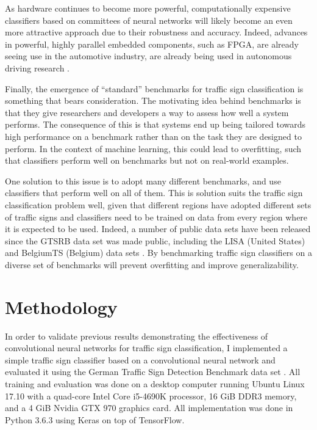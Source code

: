 \documentclass[letterpaper,twocolumn,10pt]{article}
\begin{document}
As hardware continues to become more powerful, computationally expensive classifiers based on committees of neural networks will likely become an even more attractive approach due to their robustness and accuracy. Indeed, advances in powerful, highly parallel embedded components, such as FPGA, are already seeing use in the automotive industry, are already being used in autonomous driving research \cite{fpga, fpga2}.

Finally, the emergence of ``standard'' benchmarks for traffic sign classification is something that bears consideration. The motivating idea behind benchmarks is that they give researchers and developers a way to assess how well a system performs. The consequence of this is that systems end up being tailored towards high performance on a benchmark rather than on the task they are designed to perform. In the context of machine learning, this could lead to overfitting, such that classifiers perform well on benchmarks but not on real-world examples.

One solution to this issue is to adopt many different benchmarks, and use classifiers that perform well on all of them. This is solution suits the traffic sign classification problem well, given that different regions have adopted different sets of traffic signs and classifiers need to be trained on data from every region where it is expected to be used. Indeed, a number of public data sets have been released since the GTSRB data set was made public, including the LISA (United States) and BelgiumTS (Belgium) data sets \cite{mathias_traffic_2013, mogelmose_vision-based_2012}. By benchmarking traffic sign classifiers on a diverse set of benchmarks will prevent overfitting and improve generalizability. 

\section{Methodology}

In order to validate previous results demonstrating the effectiveness of convolutional neural networks for traffic sign classification, I implemented a simple traffic sign classifier based on a convolutional neural network and evaluated it using the German Traffic Sign Detection Benchmark data set \cite{stallkamp_german_2011, stallkamp_man_2012}. All training and evaluation was done on a desktop computer running Ubuntu Linux 17.10 with a quad-core Intel Core i5-4690K processor, 16 GiB DDR3 memory, and a 4 GiB Nvidia GTX 970 graphics card. All implementation was done in Python 3.6.3 using Keras on top of TensorFlow.
\end{document}
